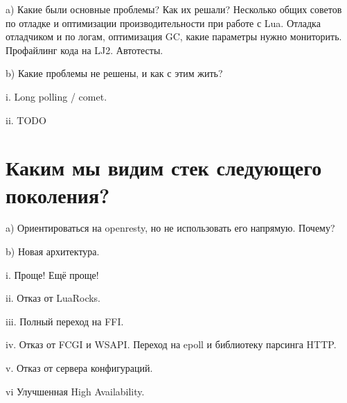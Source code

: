 \documentclass[aspectratio=169,handout]{beamer}
\begin{document}
\begin{frame}
a) Какие были основные проблемы? Как их решали? Несколько общих советов по отладке и оптимизации производительности при работе с Lua. Отладка отладчиком и по логам, оптимизация GC, какие параметры нужно мониторить. Профайлинг кода на LJ2. Автотесты.
\end{frame}

\begin{frame}
b) Какие проблемы не решены, и как с этим жить?
\end{frame}

\begin{frame}
i. Long polling / comet.
\end{frame}

\begin{frame}
ii. TODO
\end{frame}


\section{Каким мы видим стек следующего поколения?}

\begin{frame}
a) Ориентироваться на openresty, но не использовать его напрямую. Почему?
\end{frame}

\begin{frame}
b) Новая архитектура.
\end{frame}

\begin{frame}
i. Проще! Ещё проще!
\end{frame}

\begin{frame}
ii. Отказ от LuaRocks.
\end{frame}

\begin{frame}
iii. Полный переход на FFI.
\end{frame}

\begin{frame}
iv. Отказ от FCGI и WSAPI. Переход на epoll и библиотеку парсинга HTTP.
\end{frame}

\begin{frame}
v. Отказ от сервера конфигураций.
\end{frame}

\begin{frame}
vi Улучшенная High Availability.
\end{frame}
\end{document}
